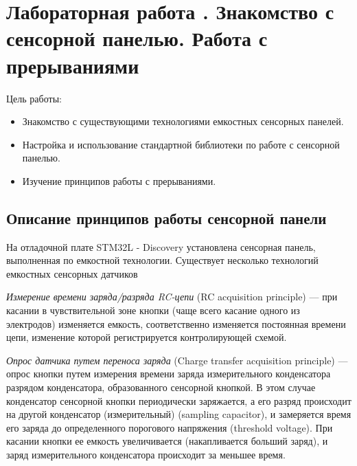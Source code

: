 \section{Лабораторная работа . Знакомство с сенсорной панелью. Работа с прерываниями}

Цель работы: 
\begin{itemize}
\item Знакомство с существующими технологиями емкостных сенсорных панелей.
\item Настройка и использование стандартной библиотеки по работе с сенсорной панелью.
\item Изучение принципов работы с прерываниями.
\end{itemize}

\subsection{Описание принципов работы сенсорной панели}
На отладочной плате STM32L - Discovery установлена сенсорная панель, выполненная по емкостной технологии. Существует несколько технологий емкостных сенсорных датчиков \cite{appnote}

\textit{Измерение времени заряда/разряда RC-цепи} (RC acquisition principle) --- при касании в чувствительной зоне кнопки (чаще всего касание одного из электродов) изменяется емкость, соответственно изменяется постоянная времени цепи, изменение которой регистрируется контролирующей схемой. 
	
	\textit{Опрос датчика путем переноса заряда} (Charge transfer acquisition principle) --- опрос кнопки путем измерения времени заряда измерительного конденсатора разрядом конденсатора, образованного сенсорной кнопкой. В этом случае конденсатор сенсорной кнопки периодически заряжается, а его разряд происходит на другой конденсатор (измерительный) (sampling capacitor), и замеряется время его заряда до определенного порогового напряжения (threshold voltage). При касании кнопки ее емкость увеличивается (накапливается больший заряд), и заряд измерительного конденсатора происходит за меньшее время.   
	
